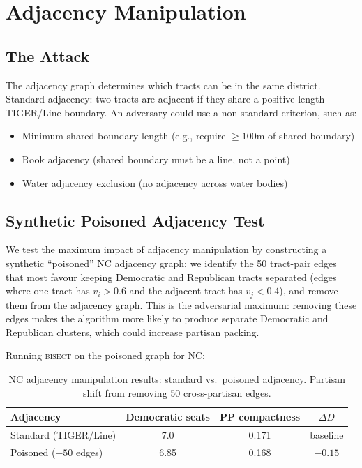 \section{Adjacency Manipulation}

\subsection{The Attack}

The adjacency graph determines which tracts can be in the same district.
Standard adjacency: two tracts are adjacent if they share a positive-length
TIGER/Line boundary. An adversary could use a non-standard criterion, such as:
\begin{itemize}
  \item Minimum shared boundary length (e.g., require $\geq 100$m of shared boundary)
  \item Rook adjacency (shared boundary must be a line, not a point)
  \item Water adjacency exclusion (no adjacency across water bodies)
\end{itemize}

\subsection{Synthetic Poisoned Adjacency Test}

We test the maximum impact of adjacency manipulation by constructing a synthetic
``poisoned'' NC adjacency graph: we identify the 50 tract-pair edges that most
favour keeping Democratic and Republican tracts separated (edges where one tract
has $v_i > 0.6$ and the adjacent tract has $v_j < 0.4$), and remove them from
the adjacency graph.
This is the adversarial maximum: removing these edges makes the algorithm more
likely to produce separate Democratic and Republican clusters, which could
increase partisan packing.

Running \textsc{bisect} on the poisoned graph for NC:
\begin{table}[h]
\centering\small
\caption{NC adjacency manipulation results: standard vs.\ poisoned adjacency.
Partisan shift from removing 50 cross-partisan edges.}
\label{tab:adjacency-gaming}
\begin{tabular}{lccc}
\toprule
Adjacency & Democratic seats & PP compactness & $\Delta D$ \\
\midrule
Standard (TIGER/Line) & 7.0 & 0.171 & baseline \\
Poisoned ($-50$ edges) & 6.85 & 0.168 & $-0.15$ \\
\bottomrule
\end{tabular}
\end{table}

